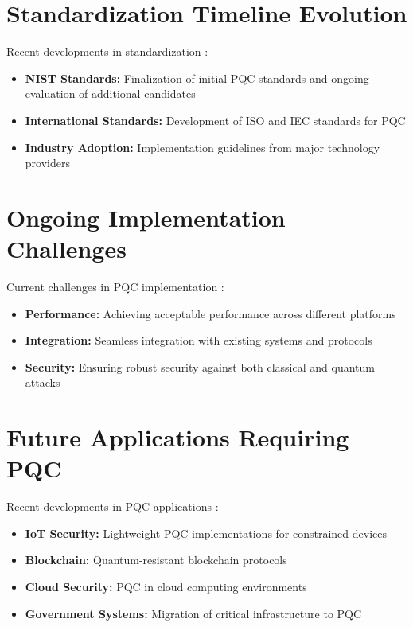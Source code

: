 \section{Standardization Timeline Evolution}\label{sec:future_timeline_ch8}

Recent developments in standardization \parencite{standardization_2024}:

\begin{itemize}
    \item \textbf{NIST Standards:} Finalization of initial PQC standards and ongoing evaluation of additional candidates
    \item \textbf{International Standards:} Development of ISO and IEC standards for PQC
    \item \textbf{Industry Adoption:} Implementation guidelines from major technology providers
\end{itemize}

\section{Ongoing Implementation Challenges}\label{sec:challenges_ch8}

Current challenges in PQC implementation \parencite{implementation_challenges_2024}:

\begin{itemize}
    \item \textbf{Performance:} Achieving acceptable performance across different platforms
    \item \textbf{Integration:} Seamless integration with existing systems and protocols
    \item \textbf{Security:} Ensuring robust security against both classical and quantum attacks
\end{itemize}

\section{Future Applications Requiring PQC}\label{sec:applications_ch8}

Recent developments in PQC applications \parencite{pqc_applications_2024}:

\begin{itemize}
    \item \textbf{IoT Security:} Lightweight PQC implementations for constrained devices \parencite{iot_pqc_2024}
    \item \textbf{Blockchain:} Quantum-resistant blockchain protocols \parencite{blockchain_pqc_2024}
    \item \textbf{Cloud Security:} PQC in cloud computing environments \parencite{cloud_pqc_2024}
    \item \textbf{Government Systems:} Migration of critical infrastructure to PQC \parencite{government_pqc_2024}
\end{itemize}

